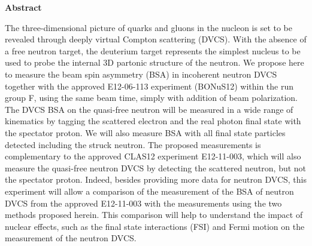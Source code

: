 \setcounter{page}{5}

     \begin{center}
{\large\textbf{Abstract}}
    \end{center}
\vspace*{0.4cm}

The three-dimensional picture of quarks and gluons in the nucleon is set to be 
revealed through deeply virtual Compton scattering (DVCS). With the absence of 
a free neutron target, the deuterium target represents the simplest nucleus to 
be used to probe the internal 3D partonic structure of the neutron.  We propose 
here to measure the beam spin asymmetry (BSA) in incoherent neutron DVCS 
together with the approved E12-06-113 experiment (BONuS12) within the run group 
F, using the same beam time, simply with addition of beam polarization.  The 
DVCS BSA on the quasi-free neutron will be measured in a wide range of 
kinematics by tagging the scattered electron and the real photon final state 
with the spectator proton. We will also measure BSA with all final state 
particles detected including the struck neutron. The proposed measurements is 
complementary to the approved CLAS12 experiment E12-11-003, which will also 
measure the quasi-free neutron DVCS by detecting the scattered neutron, but not 
the spectator proton. Indeed, besides providing more data for neutron DVCS, this experiment 
will allow a comparison of the measurement of the BSA of neutron DVCS from the 
approved E12-11-003 with the measurements using the two methods proposed herein. This 
comparison will help to understand the impact of nuclear effects, such as the 
final state interactions (FSI) and Fermi motion on the measurement of the 
neutron DVCS.

\newpage

